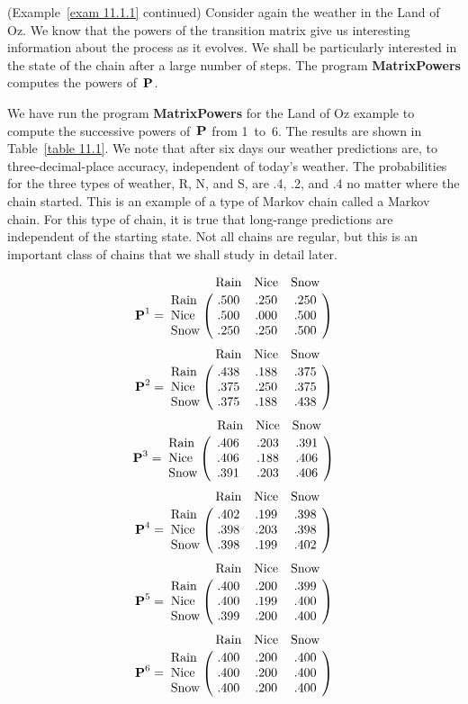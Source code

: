 \begin{example}\label{exam 11.1.1.5} (Example~\ref{exam 11.1.1} continued)
Consider again the weather in the Land of Oz.  We know that the powers of the
transition matrix give us interesting information about the process as it
evolves.  We shall be particularly interested in the state of the chain after a
large number of steps.  The program {\bf MatrixPowers} computes
the powers of~${\mbox{\bf P}\/}$.
\par
We have run the program {\bf MatrixPowers} for the Land of Oz example
to compute the successive powers of~${\mbox{\bf P}\/}$ from 1~to~6. The results are
shown 
in Table~\ref{table 11.1}.  We note that after six days our weather predictions
are, 
to three-decimal-place accuracy, independent of today's weather.  The
probabilities for the three 
types of weather, R, N, and S, are .4, .2, and .4 no matter where the chain
started.  This is an
example of a type of Markov chain called a  Markov chain.  For
this type of chain,
it is true that long-range predictions are independent of the starting state. 
Not all chains are
regular, but this is an important class of chains that we shall study in detail
later.
\begin{table}
\centering
$$
\mat{P}^1  = \bordermatrix{
            &\mbox{Rain}&\mbox{Nice}&\mbox{Snow} \cr
\mbox{Rain} & .500      & .250      & .250 \cr
\mbox{Nice} & .500      & .000      & .500 \cr
\mbox{Snow} & .250      & .250      & .500 \cr}
$$
$$  
\mat {P}^2  = \bordermatrix{
            &\mbox{Rain}&\mbox{Nice}&\mbox{Snow} \cr
\mbox{Rain} & .438     & .188       & .375 \cr
\mbox{Nice} & .375     & .250       & .375 \cr
\mbox{Snow} & .375     & .188       & .438 \cr}
$$
$$
\mat {P}^3  = \bordermatrix{
            &\mbox{ Rain}&\mbox{Nice} &\mbox{Snow} \cr
\mbox{Rain} & .406       & .203       & .391 \cr
\mbox{Nice} & .406       & .188       & .406 \cr
\mbox{Snow} & .391       & .203       & .406 \cr}
$$
$$  
\mat {P}^4  = \bordermatrix{
            &\mbox{Rain}&\mbox{Nice}&\mbox{Snow} \cr
\mbox{Rain} & .402      & .199      & .398 \cr
\mbox{Nice} & .398      & .203      & .398 \cr
\mbox{Snow} & .398      & .199      & .402 \cr}
$$
$$
\mat {P}^5  = \bordermatrix{
           &\mbox{Rain}&\mbox{Nice}&\mbox{Snow} \cr
\mbox{Rain} & .400     & .200     & .399 \cr
\mbox{Nice} & .400     & .199     & .400 \cr
\mbox{Snow} & .399     & .200     & .400 \cr}
$$
$$  
\mat {P}^6  = \bordermatrix{
           &\mbox{Rain}&\mbox{Nice}&\mbox{Snow} \cr
\mbox{Rain} & .400     & .200     & .400 \cr
\mbox{Nice} & .400     & .200     & .400 \cr
\mbox{Snow} & .400     & .200     & .400 \cr}
$$
\caption{Powers of the Land of Oz transition matrix.}
\label{table 11.1}
\end{table}
\end{example}

